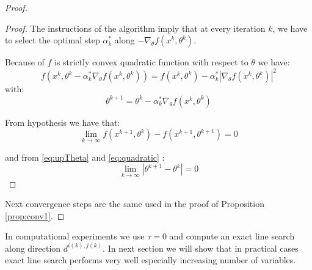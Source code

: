 \begin{proof}
\begin{proof}
The instructions of the algorithm imply that at every iteration $k$, we have to select the optimal step $\alpha_k^*$ along $-\nabla_{\theta}f(x^{k},\theta^{k})$.

Because of $f$ is strictly convex quadratic function with respect to $\theta$ we have:
\begin{equation}\label{eq:quadratic}
f(x^{k},\theta^k-\alpha^*_k\nabla_{\theta}f(x^{k},\theta^{k})) = f(x^{k},\theta^{k})-\alpha^*_k |\nabla_{\theta}f(x^{k},\theta^{k})|^2
\end{equation}
with:
\begin{equation}\label{eq:upTheta}
 \theta^{k+1}= \theta^{k}-\alpha^*_k\nabla_{\theta}f(x^{k},\theta^{k})
\end{equation}

From hypothesis we have that:
\begin{equation}
 \lim_{k \to \infty} f(x^{k+1},\theta^k)-f(x^{k+1},\theta^{k+1})=0
 \end{equation}

and from \ref{eq:upTheta} and \ref{eq:quadratic} :
\begin{equation}
  \lim_{k\to \infty} |\theta^{k+1} -\theta^k| = 0 
\end{equation}
\end{proof}
 
Next convergence steps are the same used in the proof of Proposition \ref{prop:conv1}.
\end{proof}

\begin{oss}
In computational experiments we use $\tau = 0$ and compute an exact line search along direction $d^{i(k),j(k)}$. In next section we will show that in practical cases exact line search performs very well especially increasing number of variables.
\end{oss}


